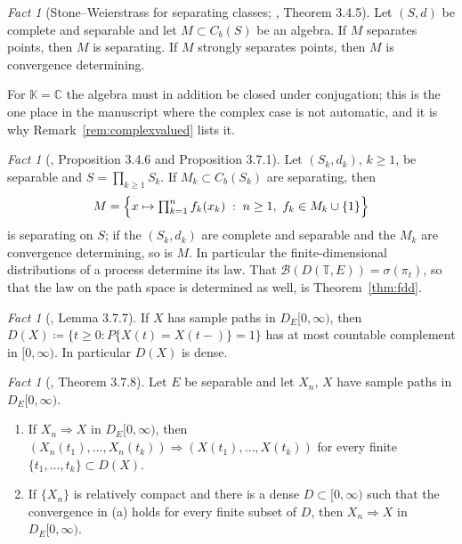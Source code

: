 \documentclass[11pt,a4paper]{article}
\theoremstyle{plain}
\theoremstyle{definition}
\theoremstyle{remark}
\newtheorem{fact}[theorem]{Fact}
\newcommand{\T}{\mathbb{T}}                     %
\newcommand{\Bor}{\mathcal{B}}                 %
\newcommand{\Cb}{C_b}                          %
\newcommand{\DE}{D_E[0,\infty)}
\newcommand{\K}{\mathbb{K}}
\newcommand{\C}{\mathbb{C}}
\DeclareMathOperator*{\wto}{\Rightarrow}
\newcommand{\EK}{\cite{EK86}}
\newcommand{\DT}{D(\T,E)}
\begin{document}
\begin{fact}[Stone--Weierstrass for separating classes; \EK, Theorem 3.4.5]
  \label{fact:stoneweierstrass}
  Let $(S,d)$ be complete and separable and let $M \subset \Cb(S)$ be an algebra.
  If $M$ separates points, then $M$ is separating.  If $M$ strongly separates
  points, then $M$ is convergence determining.

  For $\K = \C$ the algebra must in addition be closed under conjugation; this is
  the one place in the manuscript where the complex case is not automatic, and it
  is why Remark~\ref{rem:complexvalued} lists it.
\end{fact}

\begin{fact}[\EK, Proposition 3.4.6 and Proposition 3.7.1]
  \label{fact:fdd}
  Let $(S_k, d_k)$, $k \geq 1$, be separable and $S = \prod_{k \geq 1} S_k$.  If
  $M_k \subset \Cb(S_k)$ are separating, then
  \begin{equation}
    \label{eq:prodsep}
    M = \Bigl\{ x \mapsto \textstyle\prod_{k=1}^n f_k(x_k) \;:\;
      n \geq 1,\ f_k \in M_k \cup \{1\} \Bigr\}
  \end{equation}
  is separating on $S$; if the $(S_k,d_k)$ are complete and separable and the
  $M_k$ are convergence determining, so is $M$.  In particular the
  finite-dimensional distributions of a process determine its law.  That
  $\Bor(\DT) = \sigma(\pi_t)$, so that the law on the path space is determined as
  well, is Theorem~\ref{thm:fdd}.
\end{fact}

\begin{fact}[\EK, Lemma 3.7.7]
  \label{fact:Dcountable}
  If $X$ has sample paths in $\DE$, then
  $D(X) \coloneqq \{t \geq 0 : P\{X(t) = X(t-)\} = 1\}$ has at most countable
  complement in $[0,\infty)$.  In particular $D(X)$ is dense.
\end{fact}

\begin{fact}[\EK, Theorem 3.7.8]
  \label{fact:fddconv}
  Let $E$ be separable and let $X_n$, $X$ have sample paths in $\DE$.
  \begin{enumerate}[label=(\alph*), nosep]
  \item If $X_n \wto X$ in $\DE$, then
    $(X_n(t_1),\dots,X_n(t_k)) \wto (X(t_1),\dots,X(t_k))$ for every finite
    $\{t_1,\dots,t_k\} \subset D(X)$.
  \item If $\{X_n\}$ is relatively compact and there is a dense
    $D \subset [0,\infty)$ such that the convergence in (a) holds for every
    finite subset of $D$, then $X_n \wto X$ in $\DE$.
  \end{enumerate}
\end{fact}
\end{document}
